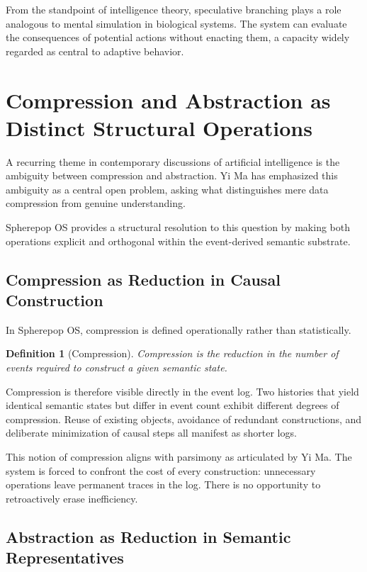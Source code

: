 \documentclass[11pt]{article}
\newtheorem{definition}{Definition}[section]
\begin{document}
From the standpoint of intelligence theory, speculative branching plays a
role analogous to mental simulation in biological systems. The system can
evaluate the consequences of potential actions without enacting them, a
capacity widely regarded as central to adaptive behavior.

\section{Compression and Abstraction as Distinct Structural Operations}

A recurring theme in contemporary discussions of artificial intelligence is
the ambiguity between compression and abstraction. Yi Ma has emphasized
this ambiguity as a central open problem, asking what distinguishes mere
data compression from genuine understanding.

Spherepop OS provides a structural resolution to this question by making
both operations explicit and orthogonal within the event-derived semantic
substrate.

\subsection{Compression as Reduction in Causal Construction}

In Spherepop OS, compression is defined operationally rather than
statistically.

\begin{definition}[Compression]
Compression is the reduction in the number of events required to construct a
given semantic state.
\end{definition}

Compression is therefore visible directly in the event log. Two histories
that yield identical semantic states but differ in event count exhibit
different degrees of compression. Reuse of existing objects, avoidance of
redundant constructions, and deliberate minimization of causal steps all
manifest as shorter logs.

This notion of compression aligns with parsimony as articulated by Yi Ma.
The system is forced to confront the cost of every construction: unnecessary
operations leave permanent traces in the log. There is no opportunity to
retroactively erase inefficiency.

\subsection{Abstraction as Reduction in Semantic Representatives}
\end{document}
